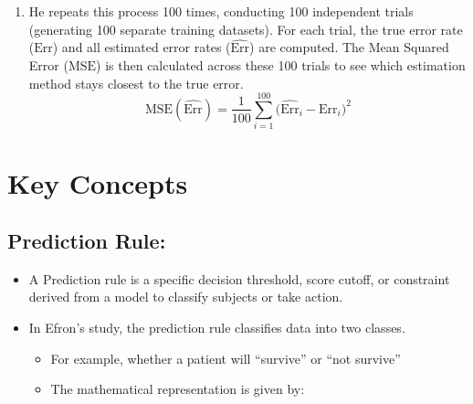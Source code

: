 \documentclass[
  letterpaper,
  DIV=11,
  numbers=noendperiod]{scrreprt}
\providecommand{\tightlist}{%
  \setlength{\itemsep}{0pt}\setlength{\parskip}{0pt}}
\begin{document}
\begin{enumerate}
  \begin{itemize}
  \tightlist
  \item
    For a Single Trial (Trial \(i\) of 100) the estomated error rates
    for each method are:

    \begin{itemize}
    \tightlist
    \item
      \(\text{Err}_i\) (True Error Rate)
    \item
      \(\widehat{\text{Err}}_{i, \text{LOOCV}}\)
    \item
      \(\widehat{\text{Err}}_{i, \text{Boot}}\)
    \item
      \(\widehat{\text{Err}}_{i, \text{RBoot}}\)
    \item
      \(\widehat{\text{Err}}_{i, \text{SRBoot}}\)
    \item
      \(\widehat{\text{Err}}_{i, \text{DBoot}}\)
    \item
      \(\widehat{\text{Err}}_{i, \text{RDBoot}}\)
    \item
      \(\widehat{\text{Err}}_{i, .632}\)
    \end{itemize}
  \end{itemize}
\item
  He repeats this process 100 times, conducting 100 independent trials
  (generating 100 separate training datasets). For each trial, the true
  error rate (\(\text{Err}\)) and all estimated error rates
  (\(\widehat{\text{Err}}\)) are computed. The Mean Squared Error
  (\(\text{MSE}\)) is then calculated across these 100 trials to see
  which estimation method stays closest to the true error.
  \[\text{MSE}(\widehat{\text{Err}}) = \frac{1}{100} \sum_{i=1}^{100} \Big( \widehat{\text{Err}}_i - \text{Err}_i \Big)^2\]
\end{enumerate}

\section{Key Concepts}\label{key-concepts}

\subsection{Prediction Rule:}\label{prediction-rule}

\begin{itemize}
\tightlist
\item
  A Prediction rule is a specific decision threshold, score cutoff, or
  constraint derived from a model to classify subjects or take action.
\item
  In Efron's study, the prediction rule classifies data into two
  classes.

  \begin{itemize}
  \tightlist
  \item
    For example, whether a patient will ``survive'' or ``not survive''
  \item
    The mathematical representation is given by:
  \end{itemize}
\end{itemize}
\end{document}
